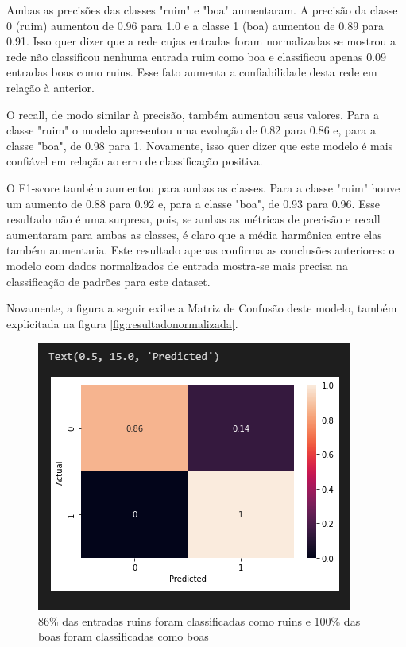 \documentclass[12pt]{article}
\begin{document}
Ambas as precisões das classes "ruim" e "boa" aumentaram. A precisão da classe 0 (ruim) aumentou de 0.96 para 1.0 e a classe 1 (boa) aumentou de 0.89 para 0.91. Isso quer dizer que a rede cujas entradas foram normalizadas se mostrou a rede não classificou nenhuma entrada ruim como boa e classificou apenas 0.09 entradas boas como ruins. Esse fato aumenta a confiabilidade desta rede em relação à anterior.

O recall, de modo similar à precisão, também aumentou seus valores. Para a classe "ruim" o modelo apresentou uma evolução de 0.82 para 0.86 e, para a classe "boa", de 0.98 para 1. Novamente, isso quer dizer que este modelo é mais confiável em relação ao erro de classificação positiva.

O F1-score também aumentou para ambas as classes. Para a classe "ruim" houve um aumento de 0.88 para 0.92 e, para a classe "boa", de 0.93 para 0.96. Esse resultado não é uma surpresa, pois, se ambas as métricas de precisão e recall aumentaram para ambas as classes, é claro que a média harmônica entre elas também aumentaria. Este resultado apenas confirma as conclusões anteriores: o modelo com dados normalizados de entrada mostra-se mais precisa na classificação de padrões para este dataset.

Novamente, a figura a seguir exibe a Matriz de Confusão deste modelo, também explicitada na figura \ref{fig:resultadonormalizada}.

\begin{figure}[H]
	\centering
	\includegraphics[width=0.7\linewidth]{Imagens/ConfusionMatrizNormalizado}
	\caption{86\% das entradas ruins foram classificadas como ruins e 100\% das boas foram classificadas como boas}
	\label{fig:confusionmatriznormalizado}
\end{figure}
\end{document}
